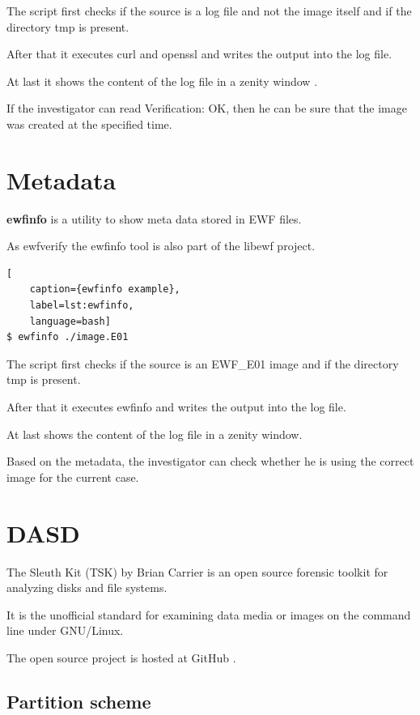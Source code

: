 The script first checks if the source is a log file and not the image itself and if the directory tmp is present.

After that it executes curl and openssl and writes the output into the log file.

At last it shows the content of the log file in a zenity window .

If the investigator can read \glqq{}Verification: OK\grqq{}, then he can be sure that the image was created at the specified time.

\section{Metadata}

\textbf{ewfinfo} is a utility to show meta data stored in EWF files.

As ewfverify the ewfinfo tool is also part of the libewf project.

\begin{lstlisting}[
    caption={ewfinfo example},
    label=lst:ewfinfo,
    language=bash]
$ ewfinfo ./image.E01
\end{lstlisting}

\noindent The script first  checks if the source is an EWF\_E01 image and if the directory tmp is present.

After that it executes ewfinfo and writes the output into the log file.

At last shows the content of the log file in a zenity window.

Based on the metadata, the investigator can check whether he is using the correct image for the current case.

\section{DASD}
\label{sec:implementation-dasd}

The Sleuth Kit (TSK) by Brian Carrier is an open source forensic toolkit for analyzing disks and file systems. \cite{Carrier2005:15}

It is the unofficial standard for examining data media or images on the command line under GNU/Linux.

The open source project is hosted at GitHub \cite{TSK}.

\subsection{Partition scheme}

